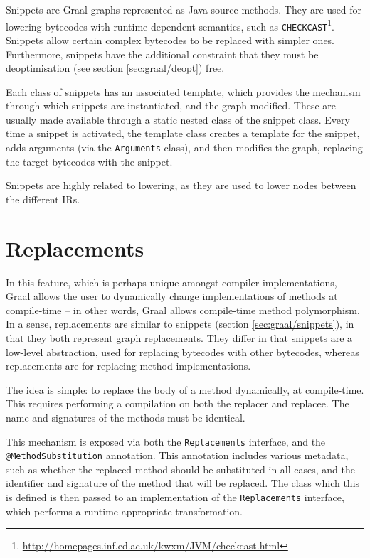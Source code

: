 Snippets are Graal graphs represented as Java source methods. They are used for lowering bytecodes with runtime-dependent semantics, such as \texttt{CHECKCAST}\footnote{\url{http://homepages.inf.ed.ac.uk/kwxm/JVM/checkcast.html}}. Snippets allow certain complex bytecodes to be replaced with simpler ones. Furthermore, snippets have the additional constraint that they must be deoptimisation (see section \ref{sec:graal/deopt}) free.

Each class of snippets has an associated template, which provides the mechanism through which snippets are instantiated, and the graph modified. These are usually made available through a static nested class of the snippet class. Every time a snippet is activated, the template class creates a template for the snippet, adds arguments (via the \texttt{Arguments} class), and then modifies the graph, replacing the target bytecodes with the snippet.

Snippets are highly related to lowering, as they are used to lower nodes between the different IRs. 
	
\section{Replacements} \label{sec:graal/replacements}
In this feature, which is perhaps unique amongst compiler implementations, Graal allows the user to dynamically change implementations of methods at compile-time -- in other words, Graal allows compile-time method polymorphism. In a sense, replacements are similar to snippets (section \ref{sec:graal/snippets}), in that they both represent graph replacements. They differ in that snippets are a low-level abstraction, used for replacing bytecodes with other bytecodes, whereas replacements are for replacing method implementations.

The idea is simple: to replace the body of a method dynamically, at compile-time. This requires performing a compilation on both the replacer and replacee. The name and signatures of the methods must be identical.

This mechanism is exposed via both the \texttt{Replacements} interface, and the\\ \texttt{{@}MethodSubstitution} annotation. This annotation includes various metadata, such as whether the replaced method should be substituted in all cases, and the identifier and signature of the method that will be replaced. The class which this is defined is then passed to an implementation of the \texttt{Replacements} interface, which performs a runtime-appropriate transformation.


